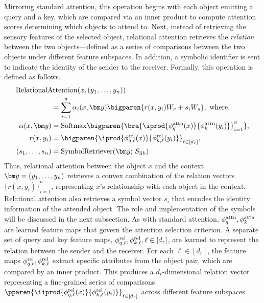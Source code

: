 Mirroring standard attention, this operation begins with each object emitting a query and a key, which are compared via an inner product to compute attention scores determining which objects to attend to. Next, instead of retrieving the sensory features of the selected object, relational attention retrieves the \textit{relation} between the two objects---defined as a series of comparisons between the two objects under different feature subspaces. In addition, a symbolic identifier is sent to indicate the identity of the sender to the receiver. Formally, this operation is defined as follows.
\begin{equation}\label{eq:rel_attn}
  \begin{split}
    &\hspace{-50pt} \RelAttn(x, \ys) \\
    &= \sum_{i=1}^{n} \alpha_i(x, \y) \bigparen{r(x, y_i) W_r + s_i W_s}, \ \text{where},\\
    \alpha(x, \y) &= \Softmax\bigparen{\bra{\iprod{\phiqattn(x)}{\phikattn(y_i)}}_{i=1}^{n}}, \\
    r(x, y_i) &= \bigparen{\iprod{\phiqrell{\ell}(x)}{\phikrell{\ell}(y_i)}}_{\ell \in [d_r]}, \\
    (s_1, \ldots, s_n) &= \SymbolRetriever(\y;\,\Slib)
  \end{split}
\end{equation}
Thus, relational attention between the object $x$ and the context $\y = \ys$ retrieves a convex combination of the relation vectors ${\{r(x, y_i)\}}_{i=1}^{n}$, representing $x$'s relationship with each object in the context. Relational attention also retrieves a symbol vector $s_i$ that encodes the identity information of the attended object. The role and implementation of the symbols will be discussed in the next subsection. As with standard attention, $\phi_q^{\mathrm{attn}}, \phi_k^{\mathrm{attn}}$ are learned feature maps that govern the attention selection criterion. A separate set of query and key feature maps, $\phi_{q, \ell}^{\mathrm{rel}}, \phi_{k, \ell}^{\mathrm{rel}}, \ell \in [d_r]$, are learned to represent the relation between the sender and the receiver. For each $\ell \in [d_r]$, the feature maps $\phi_{q, \ell}^{\mathrm{rel}}, \phi_{k, \ell}^{\mathrm{rel}}$ extract specific attributes from the object pair, which are compared by an inner product. This produces a $d_r$-dimensional relation vector representing a fine-grained series of comparisons $\pparen{\iiprod{\phiqrell{\ell}(x)}{\phikrell{\ell}(y_i)}}_{\ell \in [d_r]}$ across different feature subspaces.


